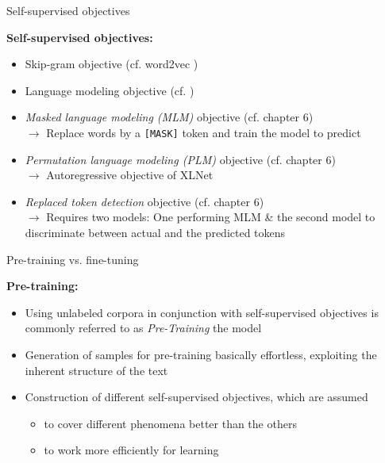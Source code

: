 
\begin{vbframe}{Self-supervised objectives}

\vfill

\textbf{Self-supervised objectives:}
	
	\begin{itemize}
		\item Skip-gram objective (cf. word2vec \href{https://arxiv.org/pdf/1301.3781.pdf}{})
		\item Language modeling objective (cf. \href{http://www.jmlr.org/papers/volume3/bengio03a/bengio03a.pdf}{})
		\item \textit{Masked language modeling (MLM)} objective (cf. chapter 6)\\
					$\rightarrow$ Replace words by a \texttt{[MASK]} token and train the model to predict
		\item \textit{Permutation language modeling (PLM)} objective (cf. chapter 6)\\
					$\rightarrow$ Autoregressive objective of XLNet
		\item \textit{Replaced token detection} objective (cf. chapter 6)\\
					$\rightarrow$ Requires two models: One performing MLM \& the second model to discriminate between actual and the predicted tokens
	\end{itemize}
\vfill

\end{vbframe}


\begin{vbframe}{Pre-training vs. fine-tuning}

\vfill

\textbf{Pre-training:}

	\begin{itemize}
		\item Using unlabeled corpora in conjunction with self-supervised objectives 
					is commonly referred to as \textit{Pre-Training} the model
		\item Generation of samples for pre-training basically effortless, exploiting 
					the inherent structure of the text
		\item Construction of different self-supervised objectives, which are assumed
			\begin{itemize}
				\item to cover different phenomena better than the others
				\item to work more efficiently for learning
			\end{itemize}
	\end{itemize}
\vfill

\end{vbframe}

